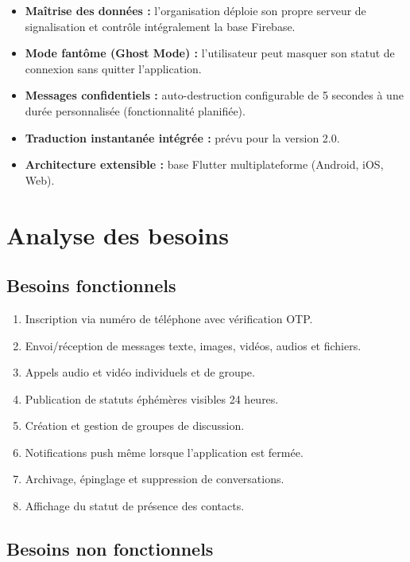 \documentclass[12pt,a4paper]{report}
\begin{document}
\begin{infobox}
\begin{itemize}
  \item \textbf{Maîtrise des données :} l'organisation déploie son propre serveur de signalisation et contrôle intégralement la base Firebase.
  \item \textbf{Mode fantôme (Ghost Mode) :} l'utilisateur peut masquer son statut de connexion sans quitter l'application.
  \item \textbf{Messages confidentiels :} auto-destruction configurable de 5 secondes à une durée personnalisée (fonctionnalité planifiée).
  \item \textbf{Traduction instantanée intégrée :} prévu pour la version 2.0.
  \item \textbf{Architecture extensible :} base Flutter multiplateforme (Android, iOS, Web).
\end{itemize}
\end{infobox}

\section{Analyse des besoins}

\subsection{Besoins fonctionnels}

\begin{enumerate}[leftmargin=1.5cm,label=\textbf{BF\arabic*}]
  \item Inscription via numéro de téléphone avec vérification OTP.
  \item Envoi/réception de messages texte, images, vidéos, audios et fichiers.
  \item Appels audio et vidéo individuels et de groupe.
  \item Publication de statuts éphémères visibles 24 heures.
  \item Création et gestion de groupes de discussion.
  \item Notifications push même lorsque l'application est fermée.
  \item Archivage, épinglage et suppression de conversations.
  \item Affichage du statut de présence des contacts.
\end{enumerate}

\subsection{Besoins non fonctionnels}
\end{document}
